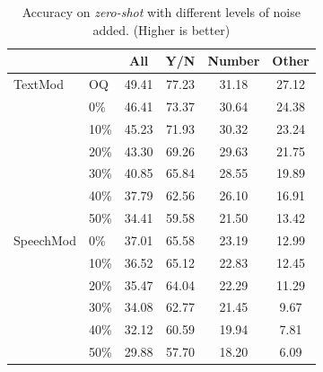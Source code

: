 \documentclass[letterpaper]{article} %
\begin{document}
\begin{table}[t]
\centering
\caption{Accuracy on \textit{zero-shot} with different levels of noise added. (Higher is better)}
\label{table:zs}
\begin{tabular}{ll|cccc}
          &                     & All    & Y/N    & Number & Other \\ \hline
TextMod   & OQ                  & 49.41  & 77.23  & 31.18  & 27.12 \\
          & 0\%                 & 46.41  & 73.37  & 30.64  & 24.38 \\
          & 10\%                & 45.23  & 71.93  & 30.32  & 23.24 \\
          & 20\%                & 43.30  & 69.26  & 29.63  & 21.75 \\
          & 30\%                & 40.85  & 65.84  & 28.55  & 19.89 \\
          & 40\%                & 37.79  & 62.56  & 26.10  & 16.91 \\
          & 50\%                & 34.41  & 59.58  & 21.50  & 13.42 \\ \hline
SpeechMod & 0\%                 & 37.01  & 65.58  & 23.19  & 12.99 \\
          & 10\%                & 36.52  & 65.12  & 22.83  & 12.45 \\
          & 20\%                & 35.47  & 64.04  & 22.29  & 11.29 \\
          & 30\%                & 34.08  & 62.77  & 21.45  &  9.67 \\
          & 40\%                & 32.12  & 60.59  & 19.94  &  7.81 \\
          & 50\%                & 29.88  & 57.70  & 18.20  &  6.09 
\end{tabular}
\end{table}
\end{document}
